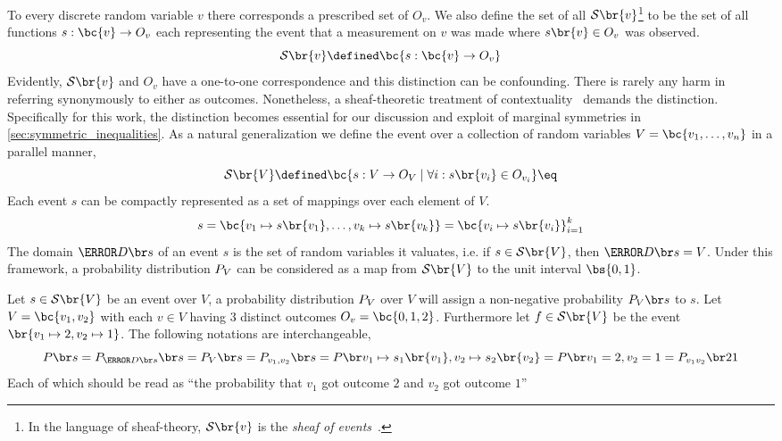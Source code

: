 \documentclass[aps, 10pt, english, twoside, pra, nofootinbib, tightenlines, longbibliography, superscriptaddress]{revtex4-1}
\renewcommand{\Events}[1]{\mathcal{S}\br{#1}} %
\begin{document}
    To every discrete random variable $v$ there corresponds a prescribed set of  $O_v$. We also define the set of all  $\Events{v}$\footnote{In the language of sheaf-theory, $\Events{v}$ is the \textit{sheaf of events}~\cite{Abramsky_2011}.} to be the set of all functions $s : \bc{v} \to O_v$ each representing the event that a measurement on $v$ was made where $s\br{v} \in O_v$ was observed.
    \[ \Events{v} \defined \bc{s : \bc{v} \to O_v} \]
    Evidently, $\Events{v}$ and $O_v$ have a one-to-one correspondence and this distinction can be confounding. There is rarely any harm in referring synonymously to either as outcomes. Nonetheless, a sheaf-theoretic treatment of contextuality~\cite{Abramsky_2011} demands the distinction.
    Specifically for this work, the distinction becomes essential for our discussion and exploit of marginal symmetries in \cref{sec:symmetric_inequalities}. As a natural generalization we define the event over a collection of random variables $V = \bc{v_1, \ldots, v_n}$ in a parallel manner,
    \[ \Events{V} \defined \bc{s: V \to O_{V} \mid \forall i : s\br{v_i} \in O_{v_i} } \eq \label{eq:outcome_space}\]
    Each event $s$ can be compactly represented as a set of mappings over each element of $V$.
    \[ s = \bc{v_1 \mapsto s\br{v_1}, \ldots, v_k \mapsto s\br{v_k}} = \bc{v_i\mapsto s\br{v_i}}_{i = 1}^{k} \]
    The domain $\Dom{s}$ of an event $s$ is the set of random variables it valuates, i.e. if $s \in \Events{V}$, then $\Dom{s} = V$. Under this framework, a probability distribution $\prob[V]$ can be considered as a map from $\Events{V}$ to the unit interval $\bs{0,1}$.
    \begin{example}
        Let $s \in \Events{V}$ be an event over $V$, a probability distribution $\prob[V]$ over $V$ will assign a non-negative probability $\prob[V][s]$ to $s$. Let $V = \bc{v_1, v_2}$ with each $v \in V$ having $3$ distinct outcomes $O_v = \bc{0,1,2}$. Furthermore let $f \in \Events{V}$ be the event $\br{v_1 \mapsto 2, v_2 \mapsto 1}$. The following notations are interchangeable,
        \[ \prob[][s] = \prob[\Dom{s}][s] = \prob[V][s] = \prob[v_1, v_2][s] = \prob[][v_1 \mapsto s_1\br{v_1}, v_2 \mapsto s_2\br{v_2}] = \prob[][v_1 = 2, v_2 = 1] = \prob[v_1v_2][21] \]
        Each of which should be read as ``the probability that $v_1$ got outcome $2$ and $v_2$ got outcome $1$''
    \end{example}
\end{document}
